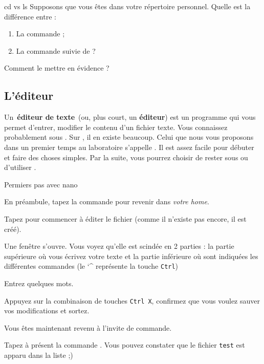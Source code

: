 \documentclass[a4paper,11pt]{style-esi/td}
\begin{document}
		\begin{Exercice}{cd vs ls}
			Supposons que vous êtes dans votre répertoire personnel.
			Quelle est la différence entre :
			\begin{enumerate}
				\item La commande  ;
				\item La commande  suivie de  ?
			\end{enumerate}
			Comment le mettre en évidence ?
		\end{Exercice}			

	\subsection{L'éditeur}

		Un \textbf{éditeur de texte} (ou, plus court, un \textbf{éditeur}) 
		est un programme qui vous permet d'entrer, modifier
		le contenu d'un fichier texte. 
		Vous connaissez probablement  sous . 
		Sur , il en existe beaucoup. 
		Celui que nous vous proposons dans un premier temps au laboratoire 
		s'appelle . 
		Il est assez facile pour débuter et faire des choses simples. 
		Par la suite, vous pourrez choisir de rester sous  
		ou d'utiliser .
        
		\begin{Tutoriel}{Permiers pas avec nano}
			\vspace{-1em}
			\begin{steps}
			\item En préambule, tapez la commande  pour revenir dans \textit{votre home}.
			\item Tapez  pour commencer à éditer le fichier  
				(comme il n'existe pas encore, il est créé).
			\item Une fenêtre s'ouvre. 
				Vous voyez qu'elle est scindée en 2 parties : 
				la partie supérieure où vous écrivez votre texte 
				et la partie inférieure où sont indiquées 
				les différentes commandes (le \char`\^{} représente la touche \verb|Ctrl|)
			\item Entrez quelques mots.
			\item Appuyez sur la combinaison de touches \verb|Ctrl X|, 
				confirmez que vous voulez sauver vos modifications et sortez.
			\item Vous êtes maintenant revenu à l'invite de commande.
			\item Tapez à présent la commande .
				Vous pouvez constater que le fichier \verb_test_ est apparu dans la liste ;)
			\end{steps}
		\end{Tutoriel}
\end{document}
